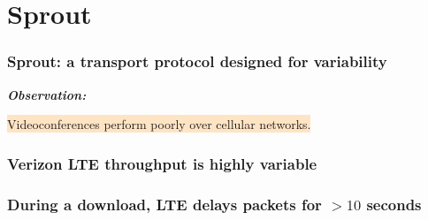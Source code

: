 \documentclass[svgnames]{beamer}
\begin{document}
\section{Sprout}

\begin{frame}
\frametitle{Sprout: a transport protocol designed for variability}

\large

\textit{\bf Observation:}

\hspace{10 pt} \colorbox{Bisque}{Videoconferences perform poorly over cellular networks.}

\vspace{\baselineskip}

\end{frame}

\begin{frame}
\frametitle{Verizon LTE throughput is highly variable}

\begin{centering}

{\small
\def\svgwidth{\columnwidth}
}

\end{centering}

\end{frame}

\begin{frame}
\frametitle{During a download, LTE delays packets for $>10$ seconds}

\begin{centering}

{\small
\def\svgwidth{0.8 \columnwidth}
}

\end{centering}

\end{frame}
\end{document}
